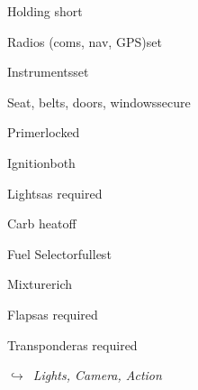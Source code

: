 \begin{multicols}{2}
\begin{checklist}{Holding short}
    \item{Radios (coms, nav, GPS)}{set}
    \item{Instruments}{set}
    \item{Seat, belts, doors, windows}{secure}
    \item{Primer}{locked}
    \item{Ignition}{both}
    \item{Lights}{as required}
    \item{Carb heat}{off}
    \item{Fuel Selector}{fullest}
    \item{Mixture}{rich}
    \item{Flaps}{as required}
    \item{Transponder}{as required}
\end{checklist}

\noindent$\hookrightarrow$\ \textit{Lights, Camera, Action}

\end{multicols}

\pagebreak

